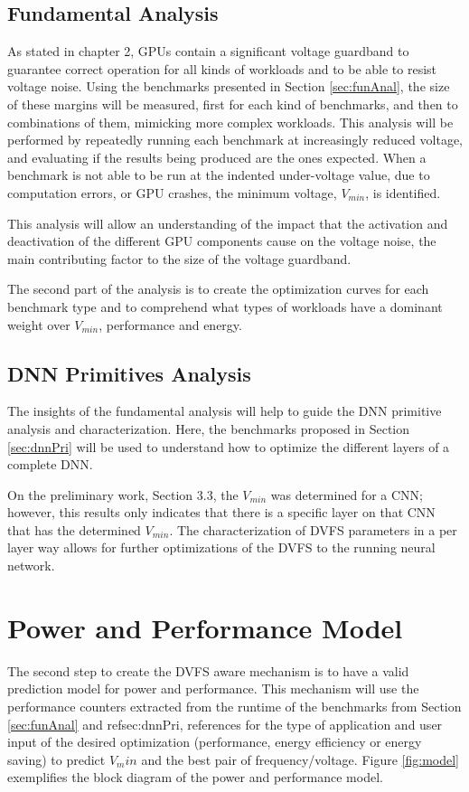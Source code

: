 \subsection{Fundamental Analysis}
\label{sec:funAnali}
As stated in chapter 2, GPUs contain a significant voltage guardband to guarantee correct operation for all kinds of workloads and to be able to resist voltage noise. Using the benchmarks presented in Section \ref{sec:funAnal}, the size of these margins will be measured, first for each kind of benchmarks, and then to combinations of them, mimicking more complex workloads. This analysis will be performed by repeatedly running each benchmark at increasingly reduced voltage, and evaluating if the results being produced are the ones expected. When a benchmark is not able to be run at the indented under-voltage value, due to computation errors, or GPU crashes, the minimum voltage, $V_{min}$, is identified.

This analysis will allow an understanding of the impact that the activation and deactivation of the different GPU components cause on the voltage noise, the main contributing factor to the size of the voltage guardband.

The second part of the analysis is to create the optimization curves for each benchmark type and to comprehend what types of workloads have a dominant weight over $V_{min}$, performance and energy.


\subsection{DNN Primitives Analysis}
The insights of the fundamental analysis will help to guide the DNN primitive analysis and characterization. Here, the benchmarks proposed in Section \ref{sec:dnnPri} will be used to understand how to optimize the different layers of a complete DNN. 

On the preliminary work, Section 3.3, the $V_{min}$ was determined for a CNN; however, this results only indicates that there is a specific layer on that CNN that has the determined  $V_{min}$. The characterization of DVFS parameters in a per layer way allows for further optimizations of the DVFS to the running neural network.

\section{Power and Performance Model}
The second step to create the DVFS aware mechanism is to have a valid prediction model for power and performance. This mechanism will use the performance counters extracted from the runtime of the benchmarks from Section \ref{sec:funAnal} and ref{sec:dnnPri}, references for the type of application and user input of the desired optimization (performance, energy efficiency or energy saving) to predict $V_min$ and the best pair of frequency/voltage. Figure \ref{fig:model} exemplifies the block diagram of the power and performance model.

